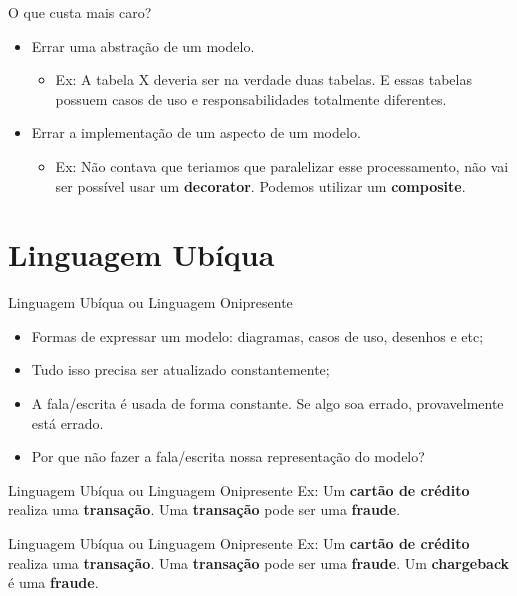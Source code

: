 \documentclass[aspectratio=169]{beamer}
\begin{document}
\begin{frame}{O que custa mais caro?}	
	\begin{multicols}{2}		
		\begin{itemize}	
			\item Errar uma abstração de um modelo.
			\begin{itemize}	
				\item Ex: A tabela X deveria ser na verdade duas tabelas. E essas tabelas possuem casos de uso e responsabilidades totalmente diferentes.
			\end{itemize}
		\end{itemize}
		\begin{itemize}	
			\item Errar a implementação de um aspecto de um modelo.
			\begin{itemize}	
				\item Ex: Não contava que teriamos que paralelizar esse processamento, não vai ser possível usar um \textbf{decorator}. Podemos utilizar um \textbf{composite}.
			\end{itemize}
		\end{itemize}
	\end{multicols}
\end{frame}

\section{Linguagem Ubíqua}
\begin{frame}{Linguagem Ubíqua ou Linguagem Onipresente}	
	\begin{itemize}	
		\item Formas de expressar um modelo: diagramas, casos de uso, desenhos e etc;
		\item Tudo isso precisa ser atualizado constantemente;
		\item A fala/escrita é usada de forma constante. Se algo soa errado, provavelmente está errado.
		\item Por que não fazer a fala/escrita nossa representação do modelo?
	\end{itemize}
\end{frame}

\begin{frame}{Linguagem Ubíqua ou Linguagem Onipresente}
	Ex: Um \textbf{cartão de crédito} realiza uma \textbf{transação}. Uma \textbf{transação} pode ser uma \textbf{fraude}.
\end{frame}

\begin{frame}{Linguagem Ubíqua ou Linguagem Onipresente}
	Ex: Um \textbf{cartão de crédito} realiza uma \textbf{transação}. Uma \textbf{transação} pode ser uma \textbf{fraude}. Um \textbf{chargeback} é uma \textbf{fraude}.
\end{frame}
\end{document}
